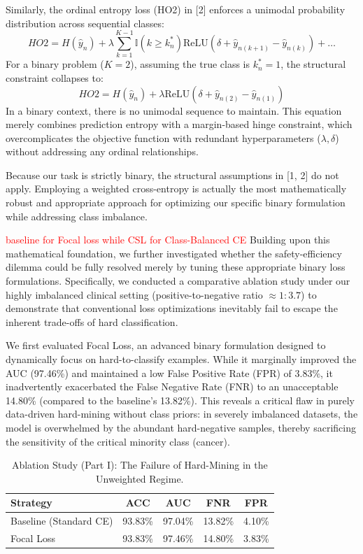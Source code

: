 \documentclass[UTF8,12pt]{article}
\begin{document}
Similarly, the ordinal entropy loss (HO2) in [2] enforces a unimodal probability distribution across sequential classes:
$$HO2 = H(\hat{y}_n) + \lambda\sum_{k=1}^{K-1}\mathbb{I}(k\ge k_{n}^{*})\text{ReLU}(\delta+\hat{y}_{n(k+1)}-\hat{y}_{n(k)}) + \dots$$
For a binary problem ($K=2$), assuming the true class is $k_n^* = 1$, the structural constraint collapses to:
$$HO2 = H(\hat{y}_n) + \lambda \text{ReLU}(\delta + \hat{y}_{n(2)} - \hat{y}_{n(1)})$$
In a binary context, there is no unimodal sequence to maintain. This equation merely combines prediction entropy with a margin-based hinge constraint, which overcomplicates the objective function with redundant hyperparameters ($\lambda, \delta$) without addressing any ordinal relationships. 

Because our task is strictly binary, the structural assumptions in [1, 2] do not apply. Employing a weighted cross-entropy is actually the most mathematically robust and appropriate approach for optimizing our specific binary formulation while addressing class imbalance.

\textcolor{red}{baseline for Focal loss while CSL for Class-Balanced CE}
Building upon this mathematical foundation, we further investigated whether the safety-efficiency dilemma could be fully resolved merely by tuning these appropriate binary loss formulations. Specifically, we conducted a comparative ablation study under our highly imbalanced clinical setting (positive-to-negative ratio $\approx 1:3.7$) to demonstrate that conventional loss optimizations inevitably fail to escape the inherent trade-offs of hard classification.

We first evaluated Focal Loss, an advanced binary formulation designed to dynamically focus on hard-to-classify examples. While it marginally improved the AUC (97.46\%) and maintained a low False Positive Rate (FPR) of 3.83\%, it inadvertently exacerbated the False Negative Rate (FNR) to an unacceptable 14.80\% (compared to the baseline's 13.82\%). This reveals a critical flaw in purely data-driven hard-mining without class priors: in severely imbalanced datasets, the model is overwhelmed by the abundant hard-negative samples, thereby sacrificing the sensitivity of the critical minority class (cancer).

\begin{table}[htbp]
  \centering
  \caption{Ablation Study (Part I): The Failure of Hard-Mining in the Unweighted Regime.}
  \label{tab:loss_unweighted}
  \begin{tabular}{lcccc}
    \toprule
    Strategy & ACC & AUC & FNR & FPR \\
    \midrule
    Baseline (Standard CE) & 93.83\% & 97.04\% & 13.82\% & 4.10\% \\
    Focal Loss             & 93.83\% & 97.46\% & 14.80\% & 3.83\% \\
    \bottomrule
  \end{tabular}
\end{table}
\end{document}
